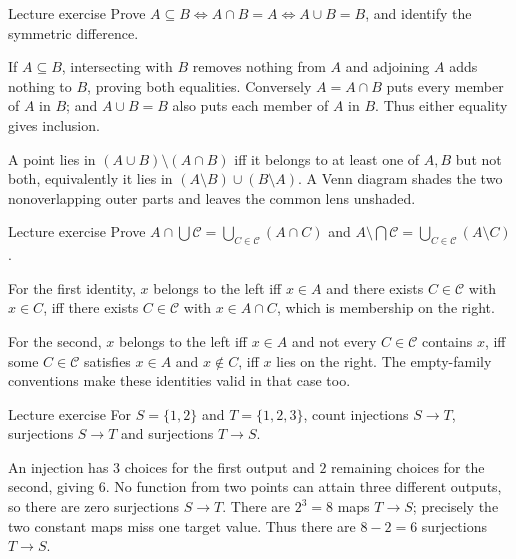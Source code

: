\begin{exam}{Lecture exercise}
Prove $A\subseteq B\iff A\cap B=A\iff A\cup B=B$, and identify the symmetric difference.
\end{exam}
\begin{answer}
If $A\subseteq B$, intersecting with $B$ removes nothing from $A$ and adjoining $A$ adds nothing to $B$, proving both equalities. Conversely $A=A\cap B$ puts every member of $A$ in $B$; and $A\cup B=B$ also puts each member of $A$ in $B$. Thus either equality gives inclusion.

A point lies in $(A\cup B)\setminus(A\cap B)$ iff it belongs to at least one of $A,B$ but not both, equivalently it lies in $(A\setminus B)\cup(B\setminus A)$. A Venn diagram shades the two nonoverlapping outer parts and leaves the common lens unshaded.
\end{answer}
\begin{exam}{Lecture exercise}
Prove $A\cap\bigcup\mathcal C=\bigcup_{C\in\mathcal C}(A\cap C)$ and $A\setminus\bigcap\mathcal C=\bigcup_{C\in\mathcal C}(A\setminus C)$.
\end{exam}
\begin{answer}
For the first identity, $x$ belongs to the left iff $x\in A$ and there exists $C\in\mathcal C$ with $x\in C$, iff there exists $C\in\mathcal C$ with $x\in A\cap C$, which is membership on the right.

For the second, $x$ belongs to the left iff $x\in A$ and not every $C\in\mathcal C$ contains $x$, iff some $C\in\mathcal C$ satisfies $x\in A$ and $x\notin C$, iff $x$ lies on the right. The empty-family conventions make these identities valid in that case too.
\end{answer}
\begin{exam}{Lecture exercise}
For $S=\{1,2\}$ and $T=\{1,2,3\}$, count injections $S\to T$, surjections $S\to T$ and surjections $T\to S$.
\end{exam}
\begin{answer}
An injection has $3$ choices for the first output and $2$ remaining choices for the second, giving $6$. No function from two points can attain three different outputs, so there are zero surjections $S\to T$. There are $2^3=8$ maps $T\to S$; precisely the two constant maps miss one target value. Thus there are $8-2=6$ surjections $T\to S$.
\end{answer}
